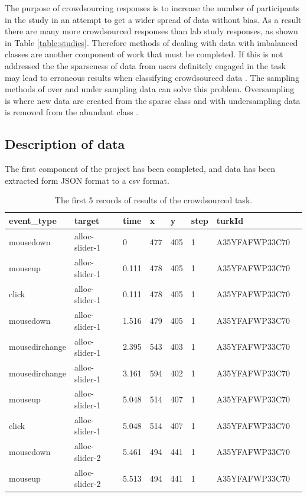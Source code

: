 \documentclass{article}
\begin{document}
The purpose of crowdsourcing responses is to increase the number of participants in the study in an attempt to get a wider spread of data without bias.
As a result there are many more crowdsourced responses than lab study responses, as shown in Table \ref{table:studies}.
Therefore methods of dealing with data with imbalanced classes are another component of work that must be completed. 
If this is not addressed the the sparseness of data from users definitely engaged in the task may lead to erroneous results when classifying crowdsourced data \cite{kubat1997addressing}.
The sampling methods of over and under sampling data can solve this problem.
Oversampling is where new data are created from the sparse class and with undersampling data is removed from the abundant class \cite{drummond2003c4}.



\subsection{Description of data}

The first component of the project has been completed, and data has been extracted form JSON format to a csv format.

\begin{table}[ht]
    \caption{\label{table:data} The first 5 records of results of the crowdsourced task.}

    \begin{tabular}{llllllll}
        \hline
        event\_type    & target         & time  & x   & y   & step & turkId         \\ \hline
        mousedown      & alloc-slider-1 & 0     & 477 & 405 & 1    & A35YFAFWP33C70 \\
        mouseup        & alloc-slider-1 & 0.111 & 478 & 405 & 1    & A35YFAFWP33C70 \\
        click          & alloc-slider-1 & 0.111 & 478 & 405 & 1    & A35YFAFWP33C70 \\
        mousedown      & alloc-slider-1 & 1.516 & 479 & 405 & 1    & A35YFAFWP33C70 \\
        mousedirchange & alloc-slider-1 & 2.395 & 543 & 403 & 1    & A35YFAFWP33C70 \\
        mousedirchange & alloc-slider-1 & 3.161 & 594 & 402 & 1    & A35YFAFWP33C70 \\
        mouseup        & alloc-slider-1 & 5.048 & 514 & 407 & 1    & A35YFAFWP33C70 \\
        click          & alloc-slider-1 & 5.048 & 514 & 407 & 1    & A35YFAFWP33C70 \\
        mousedown      & alloc-slider-2 & 5.461 & 494 & 441 & 1    & A35YFAFWP33C70 \\
        mouseup        & alloc-slider-2 & 5.513 & 494 & 441 & 1    & A35YFAFWP33C70 \\ \hline
    \end{tabular}
\end{table}
\end{document}
